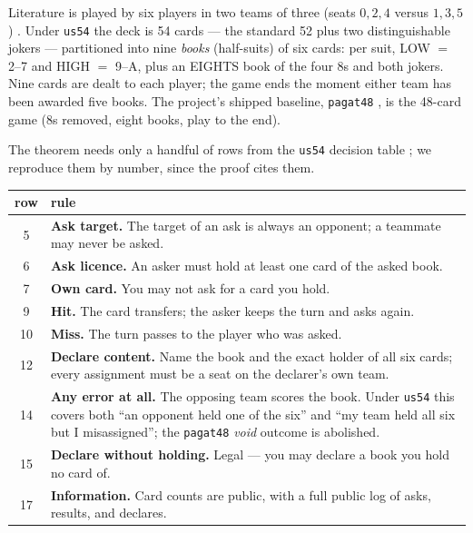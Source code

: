 \documentclass[11pt]{article}
\newcommand{\code}[1]{\texttt{#1}}
\begin{document}
Literature is played by six players in two teams of three (seats $0,2,4$
versus $1,3,5$) \cite{pagat}. Under \code{us54} \cite{rules54} the deck is 54 cards ---
the standard 52 plus two distinguishable jokers --- partitioned into nine
\emph{books} (half-suits) of six cards: per suit, LOW $=$ 2--7 and HIGH $=$
9--A, plus an EIGHTS book of the four 8s and both jokers. Nine cards are dealt
to each player; the game ends the moment either team has been awarded five
books. The project's shipped baseline, \code{pagat48} \cite{rules48}, is the
48-card game (8s removed, eight books, play to the end).

The theorem needs only a handful of rows from the \code{us54} decision table
\cite{rules54}; we reproduce them by number, since the proof cites them.

\begin{center}
\small
\begin{tabular}{@{}c p{}@{}}
\toprule
row & rule \\
\midrule
5  & \textbf{Ask target.} The target of an ask is always an opponent; a
     teammate may never be asked. \\
6  & \textbf{Ask licence.} An asker must hold at least one card of the asked
     book. \\
7  & \textbf{Own card.} You may not ask for a card you hold. \\
9  & \textbf{Hit.} The card transfers; the asker keeps the turn and asks again. \\
10 & \textbf{Miss.} The turn passes to the player who was asked. \\
12 & \textbf{Declare content.} Name the book and the exact holder of all six
     cards; every assignment must be a seat on the declarer's own team. \\
14 & \textbf{Any error at all.} The opposing team scores the book. Under
     \code{us54} this covers both ``an opponent held one of the six'' and ``my
     team held all six but I misassigned''; the \code{pagat48} \emph{void}
     outcome is abolished. \\
15 & \textbf{Declare without holding.} Legal --- you may declare a book you
     hold no card of. \\
17 & \textbf{Information.} Card counts are public, with a full public log of
     asks, results, and declares. \\
\bottomrule
\end{tabular}
\end{center}
\end{document}
